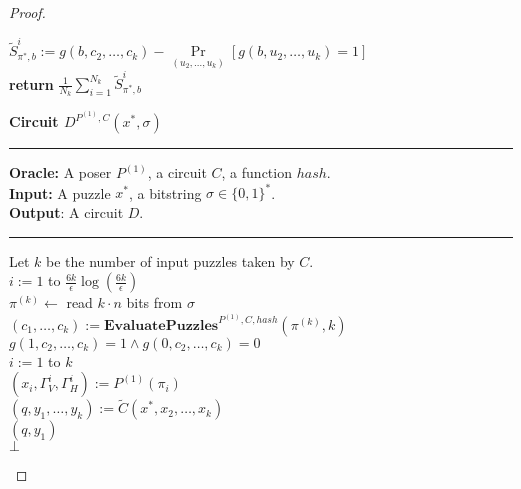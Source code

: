 \begin{proof}
\begin{codeblock}
  \IndI $\widetilde{S}_{\pi^*,b}^i := g(b, c_2, \dots, c_k) - \underset{(u_2, \dots, u_k)}{\Pr}[g(b, u_2, \dots, u_k) = 1] $\\
  \textbf{return} $\frac{1}{N_k} \sum_{i=1}^{N_k} \widetilde{S}_{\pi^*,b}^i$\\
\end{codeblock}
%
\begin{codeblock}
  \textbf{Circuit $D^{P^{(1)}, C}(x^*, \sigma)$}
  \medskip \hrule \medskip
  \textbf{Oracle:} A poser $P^{(1)}$, a circuit $C$, a function $hash$.\\
  \textbf{Input:} A puzzle $x^*$, a bitstring $\sigma \in \{0,1\}^{*}$.\\
  \textbf{Output}: A circuit $D$.
  \medskip\hrule\medskip
  Let $k$ be the number of input puzzles taken by $C$.\\
  \For $i:=1$ to $\frac{6k}{\epsilon} \log(\frac{6k}{\epsilon})$ \Do \\
  \IndI $\pi^{(k)} \leftarrow$ read $k\cdot n$ bits from $\sigma$ \\
  \IndI $(c_1, \dots, c_{k}) := \textbf{EvaluatePuzzles}^{P^{(1)}, C, hash}(\pi^{(k)}, k)$\\
  \IndI \If $g(1,c_2, \dots, c_k) =1 \land g(0,c_2, \dots, c_k) = 0$ \then \\
  \IndII \For $i:=1$ to $k$ \Do \\
  \IndIII $(x_i, \Gamma_V^{i}, \Gamma_H^{i}) := P^{(1)}(\pi_i)$\\
  \IndII $(q, y_1, \dots, y_{k}) := \widetilde{C}(x^*, x_2, \dots, x_{k})$\\
  \IndII \return $(q, y_1)$\\
  \return $\bot$ \\


\end{codeblock}
\end{proof}

